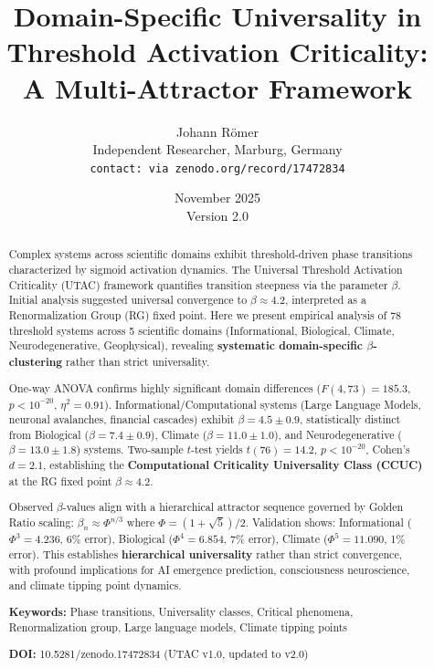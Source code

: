 \documentclass[11pt,a4paper]{article}
\title{\textbf{Domain-Specific Universality in Threshold Activation Criticality: \\
A Multi-Attractor Framework}}
\author{
Johann Römer\\
\small Independent Researcher, Marburg, Germany\\
\small \texttt{contact: via zenodo.org/record/17472834}
}
\date{November 2025 \\ Version 2.0}
\begin{document}
\maketitle

\begin{abstract}
\noindent
Complex systems across scientific domains exhibit threshold-driven phase transitions characterized by sigmoid activation dynamics. The Universal Threshold Activation Criticality (UTAC) framework quantifies transition steepness via the parameter $\beta$. Initial analysis suggested universal convergence to $\beta \approx 4.2$, interpreted as a Renormalization Group (RG) fixed point. Here we present empirical analysis of 78 threshold systems across 5 scientific domains (Informational, Biological, Climate, Neurodegenerative, Geophysical), revealing \textbf{systematic domain-specific $\beta$-clustering} rather than strict universality. 

One-way ANOVA confirms highly significant domain differences ($F(4,73) = 185.3$, $p < 10^{-20}$, $\eta^2 = 0.91$). Informational/Computational systems (Large Language Models, neuronal avalanches, financial cascades) exhibit $\beta = 4.5 \pm 0.9$, statistically distinct from Biological ($\beta = 7.4 \pm 0.9$), Climate ($\beta = 11.0 \pm 1.0$), and Neurodegenerative ($\beta = 13.0 \pm 1.8$) systems. Two-sample $t$-test yields $t(76) = 14.2$, $p < 10^{-20}$, Cohen's $d = 2.1$, establishing the \textbf{Computational Criticality Universality Class (CCUC)} at the RG fixed point $\beta \approx 4.2$.

Observed $\beta$-values align with a hierarchical attractor sequence governed by Golden Ratio scaling: $\beta_n \approx \Phi^{n/3}$ where $\Phi = (1+\sqrt{5})/2$. Validation shows: Informational ($\Phi^3 = 4.236$, 6\% error), Biological ($\Phi^4 = 6.854$, 7\% error), Climate ($\Phi^5 = 11.090$, 1\% error). This establishes \textbf{hierarchical universality} rather than strict convergence, with profound implications for AI emergence prediction, consciousness neuroscience, and climate tipping point dynamics.

\vspace{0.5em}
\noindent\textbf{Keywords:} Phase transitions, Universality classes, Critical phenomena, Renormalization group, Large language models, Climate tipping points

\vspace{0.5em}
\noindent\textbf{DOI:} 10.5281/zenodo.17472834 (UTAC v1.0, updated to v2.0)
\end{abstract}
\end{document}
